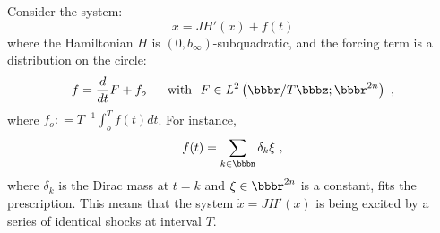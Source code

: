 \documentclass{llncs}
\begin{document}
    \begin{example} 
    Consider the system:
    \begin{equation}
      \dot{x} = JH' (x) + f(t)
    \end{equation}
    where the Hamiltonian $H$ is
    $\left(0,b_{\infty}\right)$-subquadratic, and the
    forcing term is a distribution on the circle:
    \begin{equation}
      f = \frac{d}{dt} F + f_{o}\ \ \ \ \
      {\rm with}\ \ F\in L^{2} \left(\bbbr / T\bbbz; \bbbr^{2n}\right)\ ,
    \end{equation}
    where $f_{o} : = T^{-1}\int_{o}^{T} f (t) dt$. For instance,
    \begin{equation}
      f (t) = \sum_{k\in \bbbn} \delta_{k} \xi\ ,
    \end{equation}
    where $\delta_{k}$ is the Dirac mass at $t= k$ and
    $\xi \in \bbbr^{2n}$ is a
    constant, fits the prescription. This means that the system
    $\dot{x} = JH' (x)$ is being excited by a
    series of identical shocks at interval $T$.
    \end{example}
\end{document}
